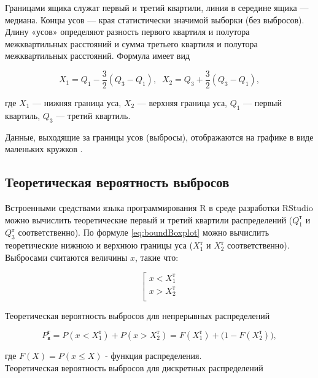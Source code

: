 \documentclass[report.tex]{subfiles}
\begin{document}
Границами ящика служат первый и третий квартили, линия в середине ящика --- медиана. Концы усов --- края статистически значимой выборки (без выбросов). Длину «усов» определяют разность первого квартиля и полутора межквартильных расстояний и сумма третьего квартиля и полутора межквартильных расстояний. Формула имеет вид

\begin{equation} \label{eq:boundBoxplot}
    X_1 = Q_1 - \dfrac{3}{2}(Q_3 - Q_1), \;\; X_2 = Q_3 + \dfrac{3}{2}(Q_3 - Q_1),
\end{equation}

где $X_1$ --- нижняя граница уса, $X_2$ --- верхняя граница уса, $Q_1$ --- первый квартиль, $Q_3$ --- третий квартиль.

Данные, выходящие за границы усов (выбросы), отображаются на графике в виде маленьких кружков \cite{s:boxplot}.

\subsection{Теоретическая вероятность выбросов}

Встроенными средствами языка программирования R в среде разработки RStudio можно вычислить теоретические первый и третий квартили распределений ($Q_1^\text{т}$ и $Q_3^\text{т}$ соответственно). По формуле \eqref{eq:boundBoxplot} можно вычислить теоретические нижнюю и верхнюю границы уса ($X_1^\text{т}$ и $X_2^\text{т}$ соответственно). Выбросами считаются величины $x$, такие что:

\begin{equation}
    \left[ 
        \begin{gathered} 
            x < X_1^\text{т}\\ 
            x > X_2^\text{т}\\ 
        \end{gathered} 
    \right.
\end{equation}

Теоретическая вероятность выбросов для непрерывных распределений

\begin{equation} \label{eq:probTheorCont}
    P_\text{в}^\text{т} = P(x < X_1^\text{т}) + P(x > X_2^\text{т}) = F(X_1^\text{т}) + \Big(1 - F(X_2^\text{т})\Big),
\end{equation}

где $F(X) = P(x \le X)$ - функция распределения.\\
    
Теоретическая вероятность выбросов для дискретных распределений
\end{document}
